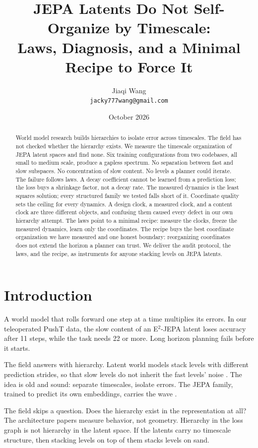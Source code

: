 \documentclass[11pt]{article}
\title{JEPA Latents Do Not Self-Organize by Timescale:\\
Laws, Diagnosis, and a Minimal Recipe to Force It}
\author{Jiaqi Wang\\ \texttt{jacky777wang@gmail.com}}
\date{October 2026}
\begin{document}
\maketitle

\begin{abstract}
World model research builds hierarchies to isolate error across timescales.
The field has not checked whether the hierarchy exists.
We measure the timescale organization of JEPA latent spaces and find none.
Six training configurations from two codebases, all small to medium scale, produce a gapless spectrum.
No separation between fast and slow subspaces.
No concentration of slow content.
No levels a planner could iterate.
The failure follows laws.
A decay coefficient cannot be learned from a prediction loss; the loss buys a shrinkage factor, not a decay rate.
The measured dynamics is the least squares solution; every structured family we tested falls short of it.
Coordinate quality sets the ceiling for every dynamics.
A design clock, a measured clock, and a content clock are three different objects, and confusing them caused every defect in our own hierarchy attempt.
The laws point to a minimal recipe: measure the clocks, freeze the measured dynamics, learn only the coordinates.
The recipe buys the best coordinate organization we have measured and one honest boundary: reorganizing coordinates does not extend the horizon a planner can trust.
We deliver the audit protocol, the laws, and the recipe, as instruments for anyone stacking levels on JEPA latents.
\end{abstract}

\section{Introduction}
\label{sec:intro}

A world model that rolls forward one step at a time multiplies its errors.
In our teleoperated PushT data, the slow content of an E$^2$-JEPA latent loses accuracy after 11 steps, while the task needs 22 or more.
Long horizon planning fails before it starts.

The field answers with hierarchy.
Latent world models stack levels with different prediction strides, so that slow levels do not inherit the fast levels' noise
\citep{hjepa,lewm}.
The idea is old and sound: separate timescales, isolate errors.
The JEPA family, trained to predict its own embeddings, carries the wave
\citep{ijepa,vjepa}.

The field skips a question.
Does the hierarchy exist in the representation at all?
The architecture papers measure behavior, not geometry.
Hierarchy in the loss graph is not hierarchy in the latent space.
If the latents carry no timescale structure, then stacking levels on top of them stacks levels on sand.
\end{document}
